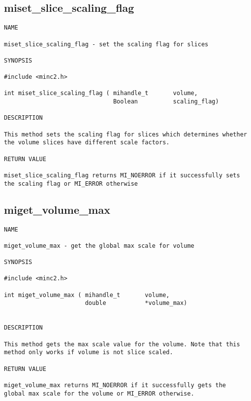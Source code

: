 \documentclass{article}
\begin{document}
\subsection{miset\_slice\_scaling\_flag}
\begin{verbatim}
NAME 

miset_slice_scaling_flag - set the scaling flag for slices

SYNOPSIS

#include <minc2.h>

int miset_slice_scaling_flag ( mihandle_t       volume,
                               Boolean          scaling_flag)
                                
DESCRIPTION

This method sets the scaling flag for slices which determines whether 
the volume slices have different scale factors.

RETURN VALUE

miset_slice_scaling_flag returns MI_NOERROR if it successfully sets 
the scaling flag or MI_ERROR otherwise
\end{verbatim}

\subsection{miget\_volume\_max}
\begin{verbatim}
NAME

miget_volume_max - get the global max scale for volume

SYNOPSIS

#include <minc2.h>

int miget_volume_max ( mihandle_t       volume,
                       double           *volume_max)


DESCRIPTION

This method gets the max scale value for the volume. Note that this 
method only works if volume is not slice scaled.

RETURN VALUE

miget_volume_max returns MI_NOERROR if it successfully gets the
global max scale for the volume or MI_ERROR otherwise. 
\end{verbatim}
\end{document}
